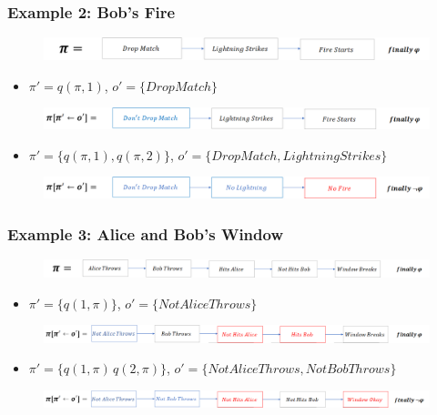 \documentclass{beamer}
\theoremstyle{plain}
\theoremstyle{definition}
\begin{document}
\begin{frame}
\frametitle{Example 2: Bob's Fire}

\begin{figure}
\includegraphics[scale=.33]{bobPlanOriginal}
\end{figure}
\begin{itemize}
\item $\pi'= q(\pi,1)$, $o'=\{Drop Match\}$
\end{itemize}
\begin{figure}
\includegraphics[scale=.32]{bobPlanCounterfactual}
\end{figure}

\begin{itemize}
\item $\pi'= \{q(\pi,1),q(\pi,2)\}$, $o'=\{Drop Match, Lightning Strikes\}$
\end{itemize}

\begin{figure}
\includegraphics[scale=.32]{bobPlanCounterfactual2}
\end{figure}
\end{frame}


\begin{frame}
\frametitle{Example 3: Alice and Bob's Window}
\begin{figure}
\includegraphics[scale=.28]{alicebobPlanOriginal}
\end{figure}
\begin{itemize}
\item $\pi'=\{q(1,\pi)\}$, $o'=\{Not Alice Throws\}$
\end{itemize}
\begin{figure}
\includegraphics[scale=.28]{alicebobPlanCounterfactual}
\end{figure}
\begin{itemize}
\item $\pi'=\{q(1,\pi)\, q(2,\pi)\}$, $o'=\{Not Alice Throws, Not Bob Throws\}$
\end{itemize}
\begin{figure}
\includegraphics[scale=.28]{alicebobPlanCounterfactual2}
\end{figure}
\end{frame}
\end{document}
